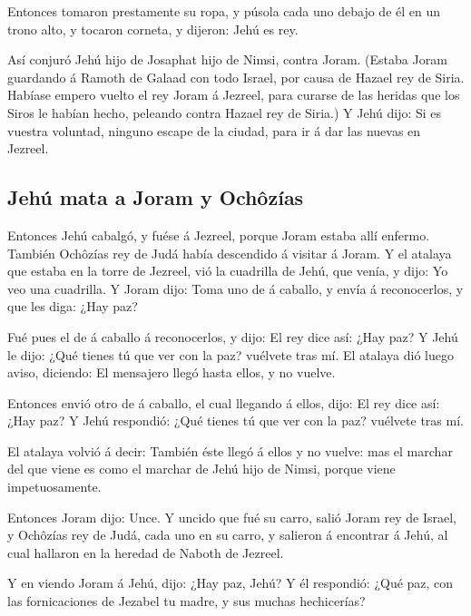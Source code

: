  Entonces tomaron prestamente su ropa, y púsola cada uno
debajo de él en un trono alto, y tocaron corneta, y dijeron: Jehú es
rey.

 Así conjuró Jehú hijo de Josaphat hijo de Nimsi, contra
Joram. (Estaba Joram guardando á Ramoth de Galaad con todo Israel, por
causa de Hazael rey de Siria.  Habíase empero vuelto el rey
Joram á Jezreel, para curarse de las heridas que los Siros le habían
hecho, peleando contra Hazael rey de Siria.) Y Jehú dijo: Si es vuestra
voluntad, ninguno escape de la ciudad, para ir á dar las nuevas en
Jezreel.

\hypertarget{jehuxfa-mata-a-joram-y-ochuxf4zuxedas}{%
\subsection{Jehú mata a Joram y
Ochôzías}\label{jehuxfa-mata-a-joram-y-ochuxf4zuxedas}}

 Entonces Jehú cabalgó, y fuése á Jezreel, porque Joram
estaba allí enfermo. También Ochôzías rey de Judá había descendido á
visitar á Joram.  Y el atalaya que estaba en la torre de
Jezreel, vió la cuadrilla de Jehú, que venía, y dijo: Yo veo una
cuadrilla. Y Joram dijo: Toma uno de á caballo, y envía á reconocerlos,
y que les diga: ¿Hay paz?

 Fué pues el de á caballo á reconocerlos, y dijo: El rey
dice así: ¿Hay paz? Y Jehú le dijo: ¿Qué tienes tú que ver con la paz?
vuélvete tras mí. El atalaya dió luego aviso, diciendo: El mensajero
llegó hasta ellos, y no vuelve.

 Entonces envió otro de á caballo, el cual llegando á
ellos, dijo: El rey dice así: ¿Hay paz? Y Jehú respondió: ¿Qué tienes tú
que ver con la paz? vuélvete tras mí.

 El atalaya volvió á decir: También éste llegó á ellos y no
vuelve: mas el marchar del que viene es como el marchar de Jehú hijo de
Nimsi, porque viene impetuosamente.

 Entonces Joram dijo: Unce. Y uncido que fué su carro,
salió Joram rey de Israel, y Ochôzías rey de Judá, cada uno en su carro,
y salieron á encontrar á Jehú, al cual hallaron en la heredad de Naboth
de Jezreel.

 Y en viendo Joram á Jehú, dijo: ¿Hay paz, Jehú? Y él
respondió: ¿Qué paz, con las fornicaciones de Jezabel tu madre, y sus
muchas hechicerías?

